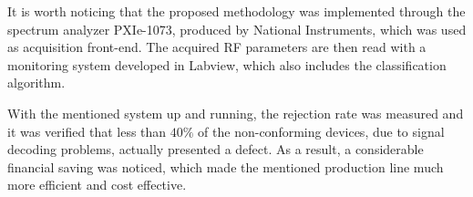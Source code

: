 \documentclass[conference]{IEEEtran}
\begin{document}
It is worth noticing that the proposed methodology was implemented through the spectrum analyzer PXIe-1073, produced by National Instruments, which was used as acquisition front-end. The acquired RF parameters are then read with a monitoring system developed in Labview, which also includes the classification algorithm.

With the mentioned system up and running, the rejection rate was measured and it was verified that less than $40\%$ of the non-conforming devices, due to signal decoding problems, actually presented a defect. As a result, a considerable financial saving was noticed, which made the mentioned production line much more efficient and cost effective.


%
%



%
%
\end{document}
